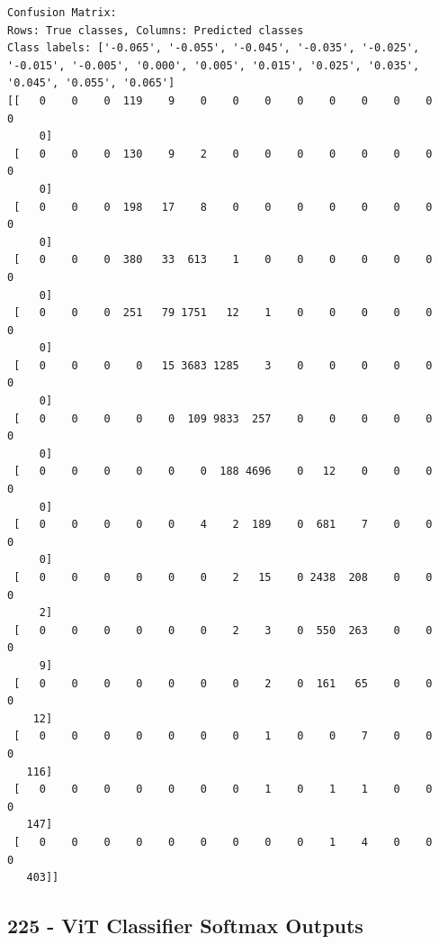 \begin{verbatim}
Confusion Matrix:
Rows: True classes, Columns: Predicted classes
Class labels: ['-0.065', '-0.055', '-0.045', '-0.035', '-0.025', '-0.015', '-0.005', '0.000', '0.005', '0.015', '0.025', '0.035', '0.045', '0.055', '0.065']
[[   0    0    0  119    9    0    0    0    0    0    0    0    0    0
     0]
 [   0    0    0  130    9    2    0    0    0    0    0    0    0    0
     0]
 [   0    0    0  198   17    8    0    0    0    0    0    0    0    0
     0]
 [   0    0    0  380   33  613    1    0    0    0    0    0    0    0
     0]
 [   0    0    0  251   79 1751   12    1    0    0    0    0    0    0
     0]
 [   0    0    0    0   15 3683 1285    3    0    0    0    0    0    0
     0]
 [   0    0    0    0    0  109 9833  257    0    0    0    0    0    0
     0]
 [   0    0    0    0    0    0  188 4696    0   12    0    0    0    0
     0]
 [   0    0    0    0    0    4    2  189    0  681    7    0    0    0
     0]
 [   0    0    0    0    0    0    2   15    0 2438  208    0    0    0
     2]
 [   0    0    0    0    0    0    2    3    0  550  263    0    0    0
     9]
 [   0    0    0    0    0    0    0    2    0  161   65    0    0    0
    12]
 [   0    0    0    0    0    0    0    1    0    0    7    0    0    0
   116]
 [   0    0    0    0    0    0    0    1    0    1    1    0    0    0
   147]
 [   0    0    0    0    0    0    0    0    0    1    4    0    0    0
   403]]

\end{verbatim}

\subsection{225 - ViT Classifier Softmax Outputs}
\label{app_res:225}

